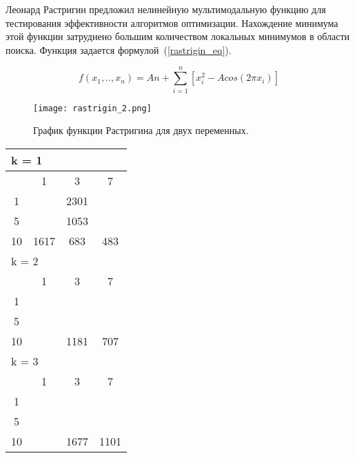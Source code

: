 Леонард Растригин предложил нелинейную мультимодальную функцию для тестирования эффективности алгоритмов оптимизации. Нахождение минимума этой функции затруднено большим количеством локальных минимумов в области поиска. Функция задается формулой~(\ref{rastrigin_eq}).

\begin{equation}
\label{rastrigin_eq}
f(x_1, .., x_n) = An + \sum\limits_{i = 1}^n\left[ x_i^2 - Acos\left(2 \pi x_i \right)\right]
\end{equation}

\begin{figure}
    \centering
    \texttt{[image: rastrigin\_2.png]}
    \caption{График функции Растригина для двух переменных.}
    \label{rastrigin_plot}
\end{figure}

\begin{table}
  \centering
  \begin{tabular}{|*4{c|}}
  \hline
  \multicolumn{4}{|l|}{k = 1} \\
  \hline
  \diagbox{$\mu$}{$\lambda$} & \multicolumn{1}{c|}{1} & \multicolumn{1}{c|}{3} & \multicolumn{1}{c|}{7} \\
  \hline
  1& \cellcolor{olive}{5124} & 2301 & \cellcolor{olive}{1411} \\
  \hline
  5& \cellcolor{olive}{1859} & 1053 & \cellcolor{olive}{401} \\
  \hline
  10 & 1617 & 683 & 483 \\
  \hline
  \multicolumn{4}{|l|}{k = 2} \\
  \hline
  \diagbox{$\mu$}{$\lambda$} & \multicolumn{1}{c|}{1} & \multicolumn{1}{c|}{3} & \multicolumn{1}{c|}{7} \\
  \hline
  1& \cellcolor{olive}{5165} & \cellcolor{olive}{3461} & \cellcolor{olive}{1753} \\
  \hline
  5& \cellcolor{olive}{1990} & \cellcolor{olive}{1396} & \cellcolor{olive}{934} \\
  \hline
  10& \cellcolor{olive}{2022} & 1181 & 707 \\
  \hline
  \multicolumn{4}{|l|}{k = 3} \\
  \hline
  \diagbox{$\mu$}{$\lambda$} & \multicolumn{1}{c|}{1} & \multicolumn{1}{c|}{3} & \multicolumn{1}{c|}{7} \\
  \hline
  1& \cellcolor{olive}{6535}& \cellcolor{olive}{3391}& \cellcolor{olive}{2573} \\
  \hline
  5& \cellcolor{olive}{3148}& \cellcolor{olive}{1721}& \cellcolor{olive}{1231} \\
  \hline
  10& \cellcolor{olive}{2352} & 1677 & 1101 \\
  \hline
  \end{tabular}
\end{table}


